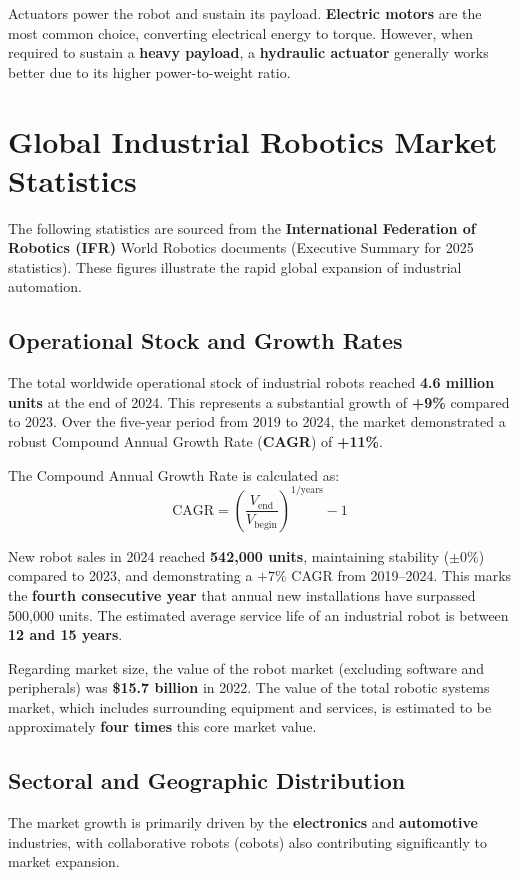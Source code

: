 \documentclass[10pt, letterpaper]{report}
\begin{document}
Actuators power the robot and sustain its payload. \textbf{Electric motors} are the most common choice, converting electrical energy to torque. However, when required to sustain a \textbf{heavy payload}, a \textbf{hydraulic actuator} generally works better due to its higher power-to-weight ratio.
\section{Global Industrial Robotics Market Statistics}\label{gemini:statistics}

The following statistics are sourced from the \textbf{International Federation of Robotics (IFR)} World Robotics documents (Executive Summary for 2025 statistics). These figures illustrate the rapid global expansion of industrial automation.

\subsection{Operational Stock and Growth Rates}
The total worldwide operational stock of industrial robots reached \textbf{4.6 million units} at the end of 2024. This represents a substantial growth of \textbf{+9\%} compared to 2023. Over the five-year period from 2019 to 2024, the market demonstrated a robust Compound Annual Growth Rate (\textbf{CAGR}) of \textbf{+11\%}.

The Compound Annual Growth Rate is calculated as:
$$\text{CAGR} = \left(\frac{V_{\text{end}}}{V_{\text{begin}}}\right)^{1/\text{years}} - 1$$

New robot sales in 2024 reached \textbf{542,000 units}, maintaining stability ($\pm 0\%$) compared to 2023, and demonstrating a $+7\%$ CAGR from 2019–2024. This marks the \textbf{fourth consecutive year} that annual new installations have surpassed 500,000 units. The estimated average service life of an industrial robot is between \textbf{12 and 15 years}.

Regarding market size, the value of the robot market (excluding software and peripherals) was \textbf{\$15.7 billion} in 2022. The value of the total robotic systems market, which includes surrounding equipment and services, is estimated to be approximately \textbf{four times} this core market value.

\subsection{Sectoral and Geographic Distribution}
The market growth is primarily driven by the \textbf{electronics} and \textbf{automotive} industries, with collaborative robots (cobots) also contributing significantly to market expansion.
\end{document}

